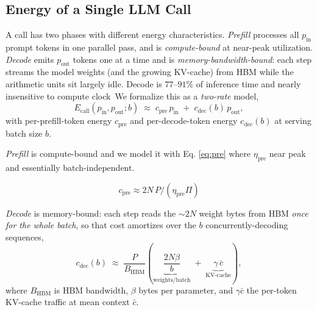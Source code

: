 \documentclass[journal]{IEEEtran}
\begin{document}
\subsection{Energy of a Single LLM Call}\label{sec:call}
A call has two phases with different energy characteristics.
\emph{Prefill} processes all $p_{\mathrm{in}}$ prompt tokens in one parallel pass, and is \textit{compute-bound} at
near-peak utilization. \emph{Decode} emits $p_{\mathrm{out}}$ tokens one at a time and is
\textit{memory-bandwidth-bound}: each step streams the model weights (and the growing KV-cache) from HBM while
the arithmetic units sit largely idle. Decode is $77$--$91\%$ of inference time and nearly
insensitive to compute clock~\cite{decode_membound2025}We formalize this as a \emph{two-rate} model,
\begin{equation}
E_{\mathrm{call}}(p_{\mathrm{in}},p_{\mathrm{out}};b)\;\approx\;
  c_{\mathrm{pre}}\,p_{\mathrm{in}}\;+\;c_{\mathrm{dec}}(b)\,p_{\mathrm{out}},
\label{eq:tworate}
\end{equation}
with per-prefill-token energy $c_{\mathrm{pre}}$ and per-decode-token energy $c_{\mathrm{dec}}(b)$ at
serving batch size $b$. 


\textit{Prefill} is compute-bound and we model it with  Eq. \ref{eq:pre} where $\eta_{\mathrm{pre}}$ near peak and essentially batch-independent.  

\begin{equation}
c_{\mathrm{pre}}\approx 2N\,P/(\eta_{\mathrm{pre}}\Pi)
\label{eq:pre}
\end{equation}

\textit{Decode} is memory-bound: each
step reads the $\sim\!2N$ weight bytes from HBM \emph{once for the whole batch}, so that cost
amortizes over the $b$ concurrently-decoding sequences,
\begin{equation}
c_{\mathrm{dec}}(b)\;\approx\;\frac{P}{B_{\mathrm{HBM}}}\!\left(\underbrace{\frac{2N\beta}{b}}_{\text{weights}/\text{batch}}
   \;+\;\underbrace{\gamma\,\bar c}_{\text{KV-cache}}\right),
\label{eq:cdec}
\end{equation}
where $B_{\mathrm{HBM}}$ is HBM bandwidth, $\beta$ bytes per parameter, and $\gamma\bar c$ the
per-token KV-cache traffic at mean context $\bar c$. 
\end{document}

